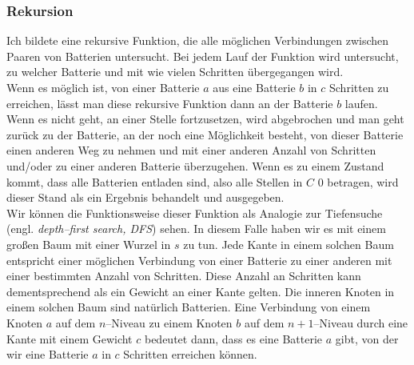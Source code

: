 \documentclass[a4paper,10pt,ngerman]{scrartcl}
\begin{document}
\subsubsection{Rekursion}
Ich bildete eine rekursive Funktion, die alle möglichen Verbindungen zwischen Paaren von Batterien untersucht.
Bei jedem Lauf der Funktion wird untersucht, zu welcher Batterie und mit wie vielen Schritten übergegangen wird.\\
Wenn es möglich ist, von einer Batterie $a$ aus eine Batterie $b$ in $c$ Schritten zu erreichen, lässt man diese rekursive
Funktion dann an der Batterie $b$ laufen. Wenn es nicht geht, an einer Stelle fortzusetzen, wird abgebrochen
und man geht zurück zu der Batterie, an der noch eine Möglichkeit besteht, von dieser Batterie einen anderen Weg zu nehmen
und mit einer anderen Anzahl von Schritten und/oder zu einer anderen Batterie überzugehen. Wenn es zu einem Zustand kommt, dass alle
Batterien entladen sind, also alle Stellen in $C$ 0 betragen, wird dieser Stand als ein Ergebnis behandelt und ausgegeben.\\

Wir können die Funktionsweise dieser Funktion als Analogie zur Tiefensuche (engl. \textit{depth--first search, DFS}) sehen.
In diesem Falle haben wir es mit einem großen Baum mit einer Wurzel in $s$ zu tun.
Jede Kante in einem solchen Baum entspricht einer möglichen
Verbindung von einer Batterie zu einer anderen mit einer bestimmten Anzahl von Schritten.
Diese Anzahl an Schritten kann dementsprechend als ein Gewicht an einer Kante gelten.
Die inneren Knoten in einem solchen Baum sind natürlich Batterien.
Eine Verbindung von einem Knoten $a$ auf dem $n$--Niveau zu einem Knoten $b$ auf dem $n+1$--Niveau
durch eine Kante mit einem Gewicht $c$ bedeutet dann, dass es eine Batterie $a$ gibt, von der wir
eine Batterie $a$ in $c$ Schritten erreichen können.\\
\end{document}
